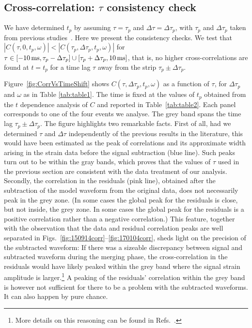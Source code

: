 \documentclass[a4paper,11pt]{article}
\begin{document}
\subsection{Cross-correlation: $\tau$ consistency check} 
\label{sec:tau-dep}

We have determined  $t_p$ by assuming $\tau=\tau_p$ and $\Delta\tau=\Delta \tau_p$, with $\tau_p$ and $\Delta \tau_p$ taken from previous studies~\cite{Creswell:2017rbh,TheLIGOScientific:2016pea}.   
Here we present the consistency checks. We test that $|C(\tau, 0, t_p, \omega)| < |C(\tau_p, \Delta \tau_p, t_p, \omega)|$ for $\tau \in [-10\,{\rm ms},\tau_p - \Delta \tau_p] \cup [\tau_p + \Delta \tau_p , 10\,{\rm ms}]$, that is, no higher cross-correlations are found at $t=t_p$ for a time lag $\tau$ away from the strip $\tau_p\pm \Delta \tau_p$.



Figure~\ref{fig:CorrVsTimeShift} shows $C(\tau, \Delta \tau_p, t_p, \omega)$ as a function of $\tau$,  for $\Delta \tau_p$ and $\omega$ as in Table 
\ref{tab:table1}. The time is fixed at the values of $t_p$ obtained from the $t$ dependence analysis of $C$ and reported in Table~\ref{tab:table2}. Each panel corresponds to one of the four events we analyse. The grey band spans the time lag $\tau_p \pm \Delta \tau_p$. The figure highlights two remarkable facts.
First of all, had we determined $\tau$ and $\Delta \tau$ independently of the previous results in the literature, this would have been estimated as 
the peak of correlations and its approximate width arising in the strain data before the signal subtraction (blue line). Such peaks turn out to be within the gray bands, which proves that the values of $\tau$ used in the previous section are consistent with the data treatment of our analysis. 
Secondly, the correlation in the residuals (pink line), obtained after the subtraction of the model waveform from the original data, does not necessarily peak in the grey zone. (In some cases the global peak for the residuals is close, but not inside, the grey zone. In some cases the global peak for the residuals is a positive correlation rather than a negative correlation.)
This feature, together with the observation that the data and residual correlation peaks are well separated in Figs.~\ref{fig:150914corr}--\ref{fig:170104corr}, 
sheds light on the precision of the subtracted waveform: If there was a sizeable discrepancy between signal and subtracted waveform during the merging phase, the cross-correlation in the residuals would have likely peaked within the grey band where the signal strain amplitude is larger.\footnote{More details on this reasoning can be found in Refs.~\cite{Creswell:2017rbh, Nielsen:2018bhc}.} A peaking of the residuals' correlation within the grey band is however not sufficient for there to be a problem with the subtracted waveforms. It can also happen by pure chance.
\end{document}
